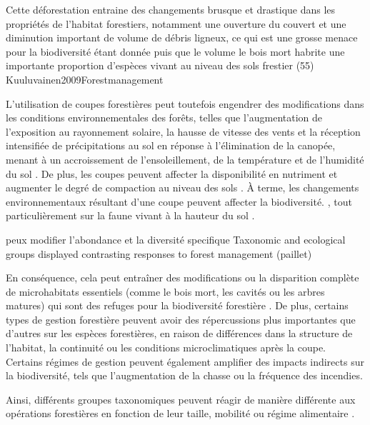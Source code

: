Cette déforestation entraine des changements brusque et drastique dans les propriétés de l'habitat forestiers, notamment une ouverture du couvert et une diminution important de volume de débris ligneux, ce qui est une grosse menace pour la biodiversité étant donnée puis que le volume le bois mort habrite une importante proportion d'espèces vivant au niveau des sols frestier (55) Kuuluvainen2009Forestmanagement

L'utilisation de coupes forestières peut toutefois engendrer des modifications dans les conditions environnementales des forêts, 
telles que l'augmentation de l'exposition au rayonnement solaire, la hausse de vitesse des vents et la réception intensifiée de précipitations au sol en réponse à l'élimination de la canopée, 
menant à un accroissement de l'ensoleillement, de la température et de l'humidité du sol \citep{Keenan1993ecologicaleffects,Lindo2003Microbialbiomass,Heithecker2007Edgerelatedgradients}.
De plus, les coupes peuvent affecter la disponibilité en nutriment et augmenter le degré de compaction au niveau des sols \citep{Covington1981Changesforest,Lindo2003Microbialbiomass,Battigelli2004Shorttermimpact,rousseauLongtermEffectsBiomass2018}. 
À terme, les changements environnementaux résultant d'une coupe peuvent affecter la biodiversité. \citep{Paillet2010Biodiversitydifferences,Fedrowitz2014Canretention,Chaudhary2016Impactforest}, 
tout particulièrement sur la faune vivant à la hauteur du sol \citep{Lindo2003Microbialbiomass,Chaudhary2016Impactforest,Kudrin2023metaanalysiseffects}.

peux modifier l'abondance et la diversité specifique
Taxonomic and ecological groups displayed contrasting responses to forest management (paillet)

En conséquence, cela peut entraîner des modifications ou la disparition complète de microhabitats essentiels (comme le bois mort, les cavités ou les arbres matures) qui sont des refuges pour la biodiversité forestière \citep{Paillet2010Biodiversitydifferences}. 
De plus, certains types de gestion forestière peuvent avoir des répercussions plus importantes que d'autres sur les espèces forestières, en raison de différences dans la structure de l'habitat, la continuité ou les conditions microclimatiques après la coupe. 
Certains régimes de gestion peuvent également amplifier des impacts indirects sur la biodiversité, tels que l'augmentation de la chasse ou la fréquence des incendies.

Ainsi, différents groupes taxonomiques peuvent réagir de manière différente aux opérations forestières en fonction de leur taille, mobilité ou régime alimentaire \citep{Barlow2007Quantifyingbiodiversity,Stork2009Vulnerabilityresilience}.


